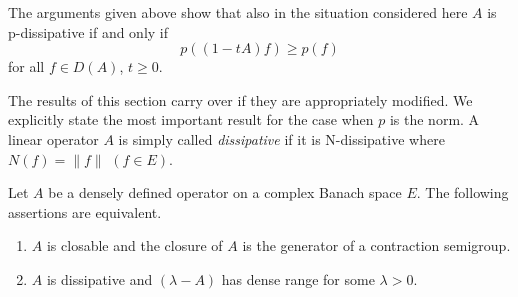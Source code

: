 The arguments given above show that also in the situation considered here $A$ is p-dissipative if and only if
\[
    p((1-tA)f) \geq p(f)
\]
for all $f \in D(A)$, $t \geq 0$.

The results of this section carry over if they are appropriately modified.
We explicitly state the most important result for the case when $p$ is the norm.
A linear operator $A$ is simply called \emph{dissipative} if it is N-dissipative where $N(f) = \|f\|$ $(f \in E)$.

\begin{theorem}\label{thm:a2-2.13}
Let $A$ be a densely defined operator on a complex Banach space $E$.
The following assertions are equivalent.
\begin{enumerate}[\upshape (a)]	
\item \label{thm:a2-2.13.1}
$A$ is closable and the closure of\/ $A$ is the generator of a contraction semigroup.
\item \label{thm:a2-2.13.2}
$A$ is dissipative and $(\lambda - A)$ has dense range for some $\lambda > 0$.
\end{enumerate}
\end{theorem}
